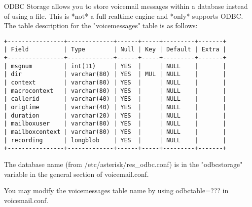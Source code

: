 

ODBC Storage allows you to store voicemail messages within a database 
instead of using a file.  This is *not* a full realtime engine and 
*only* supports ODBC.  The table description for the "voicemessages" 
table is as follows:

\begin{verbatim}
+----------------+-------------+------+-----+---------+-------+
| Field          | Type        | Null | Key | Default | Extra |
+----------------+-------------+------+-----+---------+-------+
| msgnum         | int(11)     | YES  |     | NULL    |       |
| dir            | varchar(80) | YES  | MUL | NULL    |       |
| context        | varchar(80) | YES  |     | NULL    |       |
| macrocontext   | varchar(80) | YES  |     | NULL    |       |
| callerid       | varchar(40) | YES  |     | NULL    |       |
| origtime       | varchar(40) | YES  |     | NULL    |       |
| duration       | varchar(20) | YES  |     | NULL    |       |
| mailboxuser    | varchar(80) | YES  |     | NULL    |       |
| mailboxcontext | varchar(80) | YES  |     | NULL    |       |
| recording      | longblob    | YES  |     | NULL    |       |
+----------------+-------------+------+-----+---------+-------+
\end{verbatim}

The database name (from /etc/asterisk/res\_odbc.conf) is in the 
"odbcstorage" variable in the general section of voicemail.conf.

You may modify the voicemessages table name by using 
odbctable=??? in voicemail.conf.


